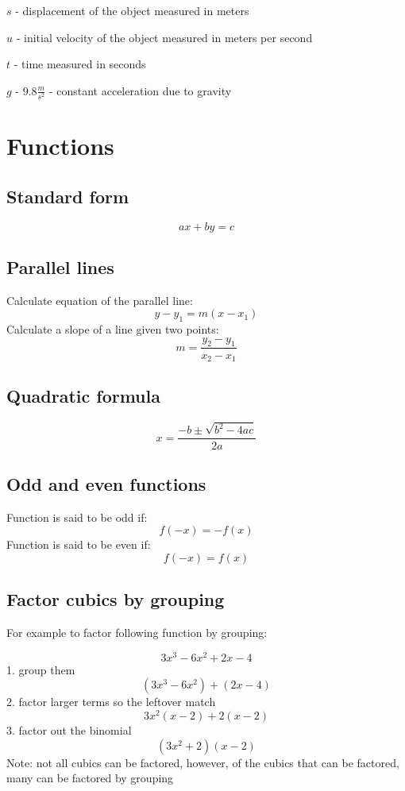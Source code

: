 \documentclass{article}
\begin{document}
$s$ - displacement of the object measured in meters

$u$ - initial velocity of the object measured in meters per second

$t$ - time measured in seconds

$g$ - $9.8\frac{m}{s^2}$ - constant acceleration due to gravity
\section{Functions}
\subsection{Standard form}
\begin{equation}
  ax + by = c
\end{equation}
\subsection{Parallel lines}
Calculate equation of the parallel line:
\begin{equation}
  y - y_1 = m(x - x_1)
\end{equation}
Calculate a slope of a line given two points:
\begin{equation}
  m = \frac{y_2 - y_1}{x_2 - x_1}
\end{equation}
\subsection{Quadratic formula}
\begin{equation}
  x = \frac{-b \pm \sqrt{b^2 - 4ac}}{2a}
\end{equation}

\subsection{Odd and even functions}
Function is said to be odd if:
\begin{equation}
  f(-x) = -f(x)
\end{equation}
Function is said to be even if:
\begin{equation}
  f(-x) = f(x)
\end{equation}
\subsection{Factor cubics by grouping}
For example to factor following function by grouping:

\begin{equation}
  3x^3-6x^2+2x-4
\end{equation}
1. group them
\begin{equation}
  (3x^3-6x^2)+(2x-4)
\end{equation}
2. factor larger terms so the leftover match
\begin{equation}
  3x^2(x-2)+2(x-2)
\end{equation}
3. factor out the binomial
\begin{equation}
  (3x^2+2)(x-2)
\end{equation}
Note: not all cubics can be factored, however,
of the cubics that can be factored,
many can be factored by grouping
\end{document}
